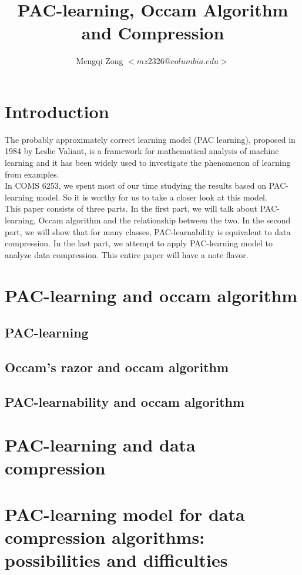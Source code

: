 \documentclass[12pt]{article}
\title{PAC-learning, Occam Algorithm and Compression}
\author{Mengqi Zong $<mz2326@columbia.edu>$}
\begin{document}
\maketitle

\setlength{\parindent}{0in}

\thispagestyle{plain}

\section{Introduction}


The probably approximately correct learning model (PAC learning), proposed in 1984 by Leslie Valiant, is a framework for mathematical analysis of machine learning and it has been widely used to investigate the phenomenon of learning from examples. \\

In COMS 6253, we spent most of our time studying the results based on PAC-learning model. So it is worthy for us to take a closer look at this model. \\

This paper consists of three parts. In the first part, we will talk about PAC-learning, Occam algorithm and the relationship between the two. In the second part, we will show that for many classes, PAC-learnability is equivalent to data compression. In the last part, we attempt to apply PAC-learning model to analyze data compression. This entire paper will have a note flavor.

\section{PAC-learning and occam algorithm}

\subsection{PAC-learning}




\subsection{Occam's razor and occam algorithm}



\subsection{PAC-learnability and occam algorithm}




\section{PAC-learning and data compression}




\section{PAC-learning model for data compression algorithms: possibilities and difficulties}

\end{document}
